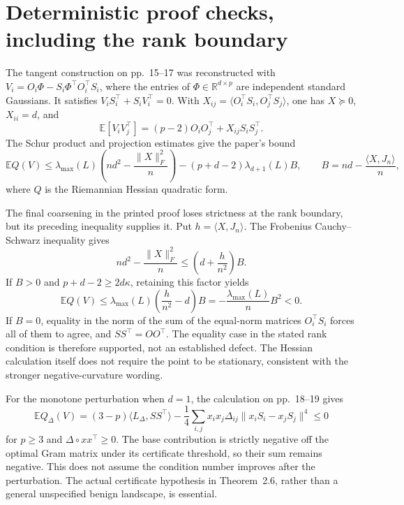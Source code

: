 \documentclass[10pt]{article}
\begin{document}
\section*{Deterministic proof checks, including the rank boundary}
The tangent construction on pp. 15–17 was reconstructed with \(V_i=O_i\Phi-S_i\Phi^\top O_i^\top S_i\), where the entries of \(\Phi\in\mathbb R^{d\times p}\) are independent standard Gaussians. It satisfies \(V_iS_i^\top+S_iV_i^\top=0\). With \(X_{ij}=\langle O_i^\top S_i,O_j^\top S_j\rangle\), one has \(X\succeq0\), \(X_{ii}=d\), and \[\mathbb E[V_iV_j^\top]=(p-2)O_iO_j^\top+X_{ij}S_iS_j^\top.\] The Schur product and projection estimates give the paper’s bound \[\mathbb E Q(V)\le
 \lambda_{\max}(L)\left(nd^2-\frac{\|X\|_F^2}{n}\right)
 -(p+d-2)\lambda_{d+1}(L)B,\qquad
 B=nd-\frac{\langle X,J_n\rangle}{n},\] where \(Q\) is the Riemannian Hessian quadratic form.\par
The final coarsening in the printed proof loses strictness at the rank boundary, but its preceding inequality supplies it. Put \(h=\langle X,J_n\rangle\). The Frobenius Cauchy–Schwarz inequality gives \[nd^2-\frac{\|X\|_F^2}{n}
 \le\left(d+\frac{h}{n^2}\right)B.\] If \(B>0\) and \(p+d-2\ge2d\kappa\), retaining this factor yields \[\mathbb E Q(V)\le
 \lambda_{\max}(L)\left(\frac{h}{n^2}-d\right)B
 =-\frac{\lambda_{\max}(L)}{n}B^2<0.\] If \(B=0\), equality in the norm of the sum of the equal-norm matrices \(O_i^\top S_i\) forces all of them to agree, and \(SS^\top=OO^\top\). The equality case in the stated rank condition is therefore supported, not an established defect. The Hessian calculation itself does not require the point to be stationary, consistent with the stronger negative-curvature wording.\par
For the monotone perturbation when \(d=1\), the calculation on pp. 18–19 gives \[\mathbb E Q_\Delta(V)=
 (3-p)\langle L_\Delta,SS^\top\rangle
 -\frac14\sum_{i,j}x_ix_j\Delta_{ij}
       \|x_iS_i-x_jS_j\|^4\le0\] for \(p\ge3\) and \(\Delta\circ xx^\top\ge0\). The base contribution is strictly negative off the optimal Gram matrix under its certificate threshold, so their sum remains negative. This does not assume the condition number improves after the perturbation. The actual certificate hypothesis in Theorem 2.6, rather than a general unspecified benign landscape, is essential.\par
\end{document}
